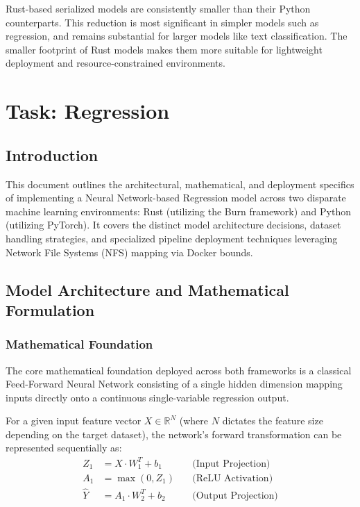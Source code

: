 \documentclass{ieeeaccess}
\begin{document}
\noindent
Rust-based serialized models are consistently smaller than their Python counterparts. This reduction is most significant in simpler models such as regression, and remains substantial for larger models like text classification. The smaller footprint of Rust models makes them more suitable for lightweight deployment and resource-constrained environments.

\clearpage

\section{Task: Regression}

\subsection{Introduction}
This document outlines the architectural, mathematical, and deployment specifics of implementing a Neural Network-based Regression model across two disparate machine learning environments: Rust (utilizing the Burn framework) and Python (utilizing PyTorch). It covers the distinct model architecture decisions, dataset handling strategies, and specialized pipeline deployment techniques leveraging Network File Systems (NFS) mapping via Docker bounds.

\subsection{Model Architecture and Mathematical Formulation}

\subsubsection{Mathematical Foundation}
The core mathematical foundation deployed across both frameworks is a classical Feed-Forward Neural Network consisting of a single hidden dimension mapping inputs directly onto a continuous single-variable regression output.

For a given input feature vector $X \in \mathbb{R}^N$ (where $N$ dictates the feature size depending on the target dataset), the network's forward transformation can be represented sequentially as:
\begin{align}
    Z_1 &= X \cdot W_1^T + b_1 \quad &\text{(Input Projection)} \\
    A_1 &= \max(0, Z_1)        \quad &\text{(ReLU Activation)} \\
    \hat{Y} &= A_1 \cdot W_2^T + b_2 \quad &\text{(Output Projection)}
\end{align}
\end{document}
